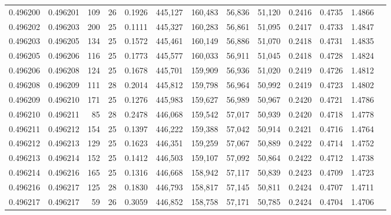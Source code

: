 \begin{tabular}{rrrrrrrrrrrrr}
0.496200 & 0.496201 & 109 &  26 &                                     0.1926 & 445,127 & 160,483 &  56,836 &  51,120 & 0.2416 & 0.4735 & 1.4866 \\
0.496202 & 0.496203 & 200 &  25 &                                     0.1111 & 445,327 & 160,283 &  56,861 &  51,095 & 0.2417 & 0.4733 & 1.4847 \\
0.496203 & 0.496205 & 134 &  25 &                                     0.1572 & 445,461 & 160,149 &  56,886 &  51,070 & 0.2418 & 0.4731 & 1.4835 \\
0.496205 & 0.496206 & 116 &  25 &                                     0.1773 & 445,577 & 160,033 &  56,911 &  51,045 & 0.2418 & 0.4728 & 1.4824 \\
0.496206 & 0.496208 & 124 &  25 &                                     0.1678 & 445,701 & 159,909 &  56,936 &  51,020 & 0.2419 & 0.4726 & 1.4812 \\
0.496208 & 0.496209 & 111 &  28 &                                     0.2014 & 445,812 & 159,798 &  56,964 &  50,992 & 0.2419 & 0.4723 & 1.4802 \\
0.496209 & 0.496210 & 171 &  25 &                                     0.1276 & 445,983 & 159,627 &  56,989 &  50,967 & 0.2420 & 0.4721 & 1.4786 \\
0.496210 & 0.496211 &  85 &  28 &                                     0.2478 & 446,068 & 159,542 &  57,017 &  50,939 & 0.2420 & 0.4718 & 1.4778 \\
0.496211 & 0.496212 & 154 &  25 &                                     0.1397 & 446,222 & 159,388 &  57,042 &  50,914 & 0.2421 & 0.4716 & 1.4764 \\
0.496212 & 0.496213 & 129 &  25 &                                     0.1623 & 446,351 & 159,259 &  57,067 &  50,889 & 0.2422 & 0.4714 & 1.4752 \\
0.496213 & 0.496214 & 152 &  25 &                                     0.1412 & 446,503 & 159,107 &  57,092 &  50,864 & 0.2422 & 0.4712 & 1.4738 \\
0.496214 & 0.496216 & 165 &  25 &                                     0.1316 & 446,668 & 158,942 &  57,117 &  50,839 & 0.2423 & 0.4709 & 1.4723 \\
0.496216 & 0.496217 & 125 &  28 &                                     0.1830 & 446,793 & 158,817 &  57,145 &  50,811 & 0.2424 & 0.4707 & 1.4711 \\
0.496217 & 0.496217 &  59 &  26 &                                     0.3059 & 446,852 & 158,758 &  57,171 &  50,785 & 0.2424 & 0.4704 & 1.4706 \\

\end{tabular}
